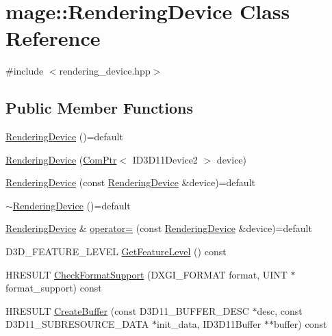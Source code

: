 \hypertarget{classmage_1_1_rendering_device}{}\section{mage\+:\+:Rendering\+Device Class Reference}
\label{classmage_1_1_rendering_device}


{\ttfamily \#include $<$rendering\+\_\+device.\+hpp$>$}

\subsection*{Public Member Functions}
\begin{DoxyCompactItemize}
\item 
\hyperlink{classmage_1_1_rendering_device_a45e633feaaa5ab50ca0aa5ebe0c9d3ad}{Rendering\+Device} ()=default
\item 
\hyperlink{classmage_1_1_rendering_device_a6debbd87d19c4bf7e7cb44206a05dfff}{Rendering\+Device} (\hyperlink{namespacemage_ae74f374780900893caa5555d1031fd79}{Com\+Ptr}$<$ I\+D3\+D11\+Device2 $>$ device)
\item 
\hyperlink{classmage_1_1_rendering_device_a097bab0f95e5f119ccad05833af417ae}{Rendering\+Device} (const \hyperlink{classmage_1_1_rendering_device}{Rendering\+Device} \&device)=default
\item 
\hyperlink{classmage_1_1_rendering_device_a17a00607a746fb6fed0ff76a8ce13dc2}{$\sim$\+Rendering\+Device} ()=default
\item 
\hyperlink{classmage_1_1_rendering_device}{Rendering\+Device} \& \hyperlink{classmage_1_1_rendering_device_a5d2a76086e876f5932e715f4bcdef726}{operator=} (const \hyperlink{classmage_1_1_rendering_device}{Rendering\+Device} \&device)=default
\item 
D3\+D\+\_\+\+F\+E\+A\+T\+U\+R\+E\+\_\+\+L\+E\+V\+EL \hyperlink{classmage_1_1_rendering_device_a1bdcb0b7047cf01160953e99083b3185}{Get\+Feature\+Level} () const
\item 
H\+R\+E\+S\+U\+LT \hyperlink{classmage_1_1_rendering_device_a23ae414e475b1de5d721ac5acd5e4545}{Check\+Format\+Support} (D\+X\+G\+I\+\_\+\+F\+O\+R\+M\+AT format, U\+I\+NT $\ast$format\+\_\+support) const
\item 
H\+R\+E\+S\+U\+LT \hyperlink{classmage_1_1_rendering_device_a45327af43c2af0bfced6bc02e038589a}{Create\+Buffer} (const D3\+D11\+\_\+\+B\+U\+F\+F\+E\+R\+\_\+\+D\+E\+SC $\ast$desc, const D3\+D11\+\_\+\+S\+U\+B\+R\+E\+S\+O\+U\+R\+C\+E\+\_\+\+D\+A\+TA $\ast$init\+\_\+data, I\+D3\+D11\+Buffer $\ast$$\ast$buffer) const
$$
\end{DoxyCompactItemize}
